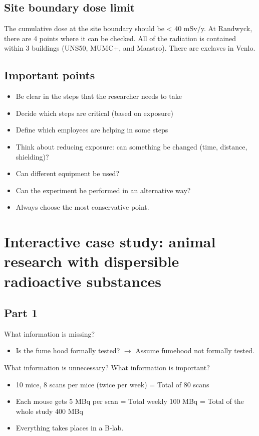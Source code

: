 \subsection{Site boundary dose limit}
The cumulative dose at the site boundary should be < 40 mSv/y. At Randwyck, there are 4 points where it can be checked. All of the radiation is contained within 3 buildings (UNS50, MUMC+, and Maastro). There are exclaves in Venlo.

\subsection{Important points}
\begin{itemize}
	\item Be clear in the steps that the researcher needs to take
	\item Decide which steps are critical (based on exposure)
	\item Define which employees are helping in some steps
	\item Think about reducing exposure: can something be changed (time, distance, shielding)?
	\item Can different equipment be used?
	\item Can the experiment be performed in an alternative way?
	\item Always choose the most conservative point.
\end{itemize}

\section{Interactive case study: animal research with dispersible radioactive substances}
\subsection{Part 1}
What information is missing?
\begin{itemize}
	\item Is the fume hood formally tested? $\rightarrow$ Assume fumehood not formally tested.
\end{itemize}
What information is unnecessary?
What information is important?
\begin{itemize}
	\item 10 mice, 8 scans per mice (twice per week) = Total of 80 scans
	\item Each mouse gets 5 MBq per scan = Total weekly 100 MBq = Total of the whole study 400 MBq
	\item Everything takes places in a B-lab.
\end{itemize}